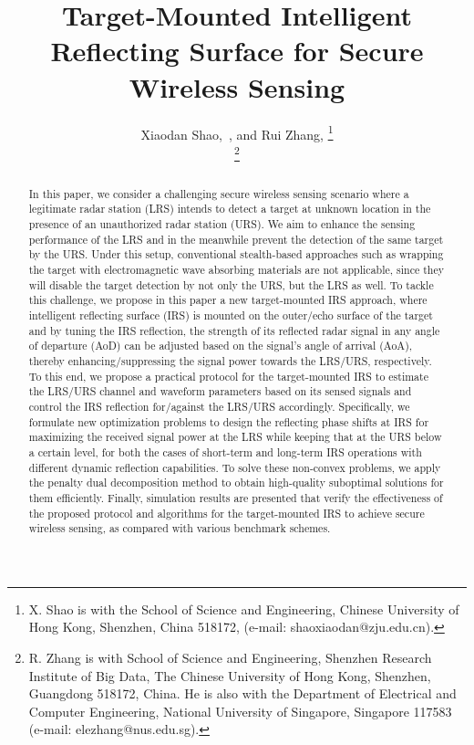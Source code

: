 \documentclass[10pt,final,doublecolumn]{IEEEtran}
\begin{document}
\title{Target-Mounted Intelligent Reflecting Surface for Secure Wireless Sensing}
\author{{Xiaodan Shao,~, and Rui Zhang, }
	 \thanks{X. Shao is with the School of Science and Engineering, Chinese University of Hong Kong, Shenzhen, China 518172, (e-mail: shaoxiaodan@zju.edu.cn).}

\thanks{R. Zhang is with School of Science and Engineering, Shenzhen Research Institute of Big Data, The Chinese University of Hong Kong, Shenzhen, Guangdong 518172, China. He is also with the Department of Electrical and Computer Engineering, National University of Singapore, Singapore 117583 (e-mail: elezhang@nus.edu.sg).
}
}
\maketitle
\begin{abstract}
In this paper, we consider a challenging secure wireless sensing scenario where a legitimate radar station (LRS) intends to detect a target at unknown location in the presence of an unauthorized radar station (URS). We aim to enhance the sensing performance of the LRS and in the meanwhile prevent the detection of the same target by the URS. Under this setup, conventional stealth-based approaches such as wrapping the target with electromagnetic wave absorbing materials are not applicable, since they will disable the target detection by not only the URS, but the LRS as well. To tackle this challenge, we propose in this paper a new target-mounted IRS approach, where intelligent reflecting surface (IRS) is mounted on the outer/echo surface of the target and by tuning the IRS reflection, the strength of its reflected radar signal in any angle of departure (AoD) can be adjusted based on the signal's angle of arrival (AoA), thereby enhancing/suppressing the signal power towards the LRS/URS, respectively. To this end, we propose a practical protocol for the target-mounted IRS to estimate the LRS/URS channel and waveform parameters based on its sensed signals and control the IRS reflection for/against the LRS/URS accordingly. Specifically, we formulate new optimization problems to design the reflecting phase shifts at IRS for maximizing the received signal power at the LRS while keeping that at the URS below a certain level, for both the cases of short-term and long-term IRS operations with different dynamic reflection capabilities. To solve these non-convex problems, we apply the penalty dual decomposition method to obtain high-quality suboptimal solutions for them efficiently. Finally, simulation results are presented that verify the effectiveness of the proposed protocol and algorithms for the target-mounted IRS to achieve secure wireless sensing, as compared with various benchmark schemes.
\end{abstract}
\end{document}
